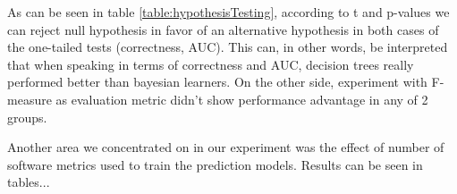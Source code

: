 As can be seen in table \ref{table:hypothesisTesting}, according to t and p-values we can reject null hypothesis in favor of an alternative hypothesis in both cases of the one-tailed tests (correctness, AUC). This can, in other words, be interpreted that when speaking in terms of correctness and AUC, decision trees really performed better than bayesian learners. On the other side, experiment with F-measure as evaluation metric didn't show performance advantage in any of 2 groups.

Another area we concentrated on in our experiment was the effect of number of software metrics used to train the prediction models. Results can be seen in tables...
